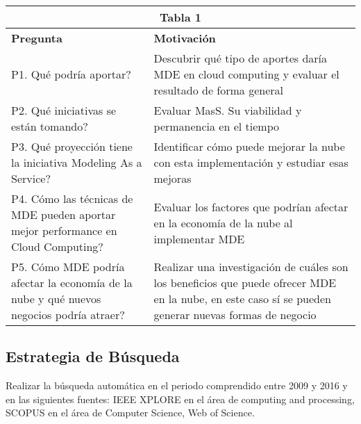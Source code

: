 \documentclass{llncs}
\begin{document}
\begin{tabular}{  | p{5cm} | p{7cm}  | }
  \hline
  \multicolumn{2}{|c|}{\bf Tabla 1} \\
  \hline
  \bf Pregunta & \bf Motivación \\
  \hline
  P1. Qué podría aportar?  & Descubrir qué tipo de aportes daría MDE en cloud computing y evaluar el resultado de forma general\\
  \hline
  P2. Qué iniciativas se están tomando? & Evaluar MasS. Su viabilidad y permanencia en el tiempo\\
  \hline
  P3. Qué proyección tiene la iniciativa Modeling As a Service? & Identificar cómo puede mejorar la nube con esta implementación y estudiar esas mejoras\\
  \hline
  P4. Cómo las técnicas de MDE pueden aportar mejor performance en Cloud Computing?  & Evaluar los factores que podrían afectar en la economía de la nube al implementar MDE\\
  \hline
  P5. Cómo MDE podría afectar la economía de la nube y qué nuevos negocios podría atraer? & Realizar una investigación de cuáles son los beneficios que puede ofrecer MDE en la nube, en este caso sí se pueden generar nuevas formas de negocio\\
  \hline
\end{tabular}

\subsection{Estrategia de Búsqueda}
Realizar la búsqueda automática  en el periodo comprendido entre 2009 y 2016 y en las siguientes fuentes: IEEE XPLORE en el área de computing and processing, SCOPUS en el área de Computer Science, Web of Science.
\end{document}
